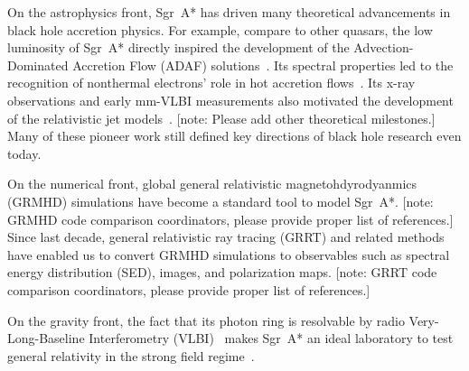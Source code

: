 \documentclass[twocolumn,tighten,dvipsnames]{aastex63}
\newcommand\sgra{Sgr~A*\xspace}
\newcommand\<{{\langle}}
\renewcommand\>{{\rangle}} %
\newcommand\note[1]{{\color{OliveGreen}[note: #1]}}
\begin{document}
On the astrophysics front, \sgra has driven many theoretical
advancements in black hole accretion physics.
For example, compare to other quasars, the low luminosity of \sgra
directly inspired the development of the Advection-Dominated Accretion
Flow (ADAF) solutions~\citep{1994ApJ...428L..13N, 1995ApJ...444..231N,
  1995ApJ...452..710N, 1996A&AS..120C.287N, 1998ApJ...492..554N}.
Its spectral properties led to the recognition of nonthermal
electrons' role in hot accretion flows~\citep{2000ApJ...541..234O}.
Its x-ray observations and early mm-VLBI measurements also motivated
the development of the relativistic jet
models~\citep{2000A&A...362..113F, 2004A&A...414..895F,
  2005ApJ...635.1203M}.
\note{Please add other theoretical milestones.}
Many of these pioneer work still defined key directions of black hole
research even today.

On the numerical front, global general relativistic
magnetohdyrodyanmics (GRMHD) simulations
\citep[e.g.,][]{2000ApJ...528..462H, 2003ApJ...589..458D,
  2003ApJ...589..444G, 2007CQGra..24S.235G, 2012ApJS..201....9F,
  2014ApJ...796...22F, 2016ApJS..225...22W, 2017ApJS..231...17A,
  2018JPhCS1031a2008O, 2019A&A...629A..61O, 2019ApJS..243...26P} have
become a standard tool to model \sgra.
\note{GRMHD code comparison coordinators, please provide proper list
  of references.}
Since last decade, general relativistic ray tracing (GRRT) and related
methods \citep[e.g.,][]{2009ApJ...696.1616D, 2009ApJS..184..387D,
  2012ApJ...745....1P, 2013ApJ...777...11S, 2013ApJ...777...13C,
  2016MNRAS.462..115D, 2016ApJ...820..105P, 2018ApJ...867...59C,
  2018A&A...613A...2B, 2020ApJ...897..148G, 2020arXiv200703045B} have
enabled us to convert GRMHD simulations to observables such as
spectral energy distribution (SED), images, and polarization maps.
\note{GRRT code comparison coordinators, please provide proper list of
  references.}

On the gravity front, the fact that its photon ring is resolvable by
radio Very-Long-Baseline Interferometry
(VLBI)~\citep{2000ApJ...528L..13F} makes \sgra an ideal laboratory to
test general relativity in the strong field
regime~\citep{2010ApJ...718..446J, 2014ApJ...784....7B,
  2015ApJ...802...63B, 2015ApJ...814..115P, 2016ApJ...818..121P,
  2016PhRvL.117i1101J, 2019GReGr..51..137P}.
\end{document}
